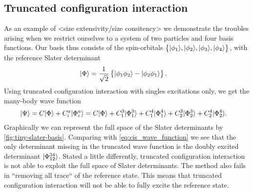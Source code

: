         \subsection{Truncated configuration interaction}
            \label{sub:truncated-configuration-interaction}
            As an example of <size extensivity/size consitency> we demonstrate
            the troubles arising when we restrict ourselves to a system of two
            particles and four basis functions.
            Our basis thus consists of the spin-orbitals $\left\{ | \phi_1 \rangle,
            | \phi_2 \rangle, | \phi_3 \rangle, | \phi_4 \rangle \right\}$, with the reference
            Slater determinant
            \begin{align}
                | \Phi \rangle
                &= \frac{1}{\sqrt{2}}\left\{ 
                    | \phi_1\phi_2 \rangle
                    - | \phi_2\phi_1 \rangle
                 \right\}.
            \end{align}
            Using truncated configuration interaction with singles excitations
            only, we get the many-body wave function
            \begin{align}
                | \Psi \rangle
                &= C| \Phi \rangle
                + C^{a}_{i}| \Phi^{a}_{i} \rangle
                = C| \Phi \rangle
                + C^{3}_{1}| \Phi^{3}_{1} \rangle
                + C^{4}_{1}| \Phi^{4}_{1} \rangle
                + C^{3}_{2}| \Phi^{3}_{2} \rangle
                + C^{4}_{2}| \Phi^{4}_{2} \rangle.
                \label{eq:cis_wave_function}
            \end{align}
            Graphically we can represent the full space of the Slater determinants
            by \autoref{fig:tiny-slater-basis}.
            Comparing with \autoref{eq:cis_wave_function} we see that the only
            determinant missing in the truncated wave function is the doubly
            excited determinant $| \Phi^{34}_{12} \rangle$.
            Stated a little differently, truncated configuration interaction is
            not able to exploit the full space of Slater determinants.
            The method also fails in ``removing all trace`` of the reference
            state.
            This means that truncated configuration interaction will not be able
            to fully excite the reference state.

